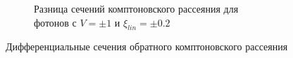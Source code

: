 \documentclass[12pt]{article}
\begin{document}
\begin{figure}[H]
\begin{subfigure}{.5\textwidth}
		\caption{Разница сечений комптоновского рассеяния для фотонов с $V=\pm1$ и $\xi_{lin}=\pm0.2$ }
		\label{fig:dsdxdy_dQ0.1&dV=1}
	\end{subfigure}
	\caption{Дифференциальные сечения обратного комптоновского рассеяния}
	\label{fig:fig}
\end{figure}




 

















\newpage
\vfill
\end{document}
